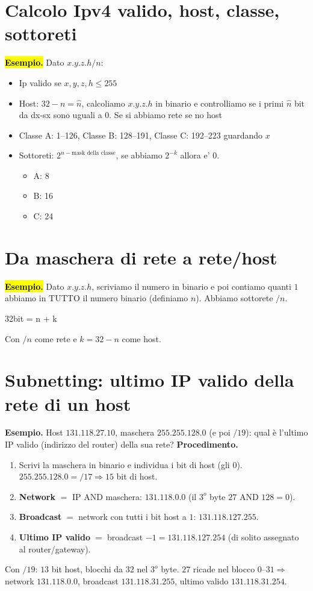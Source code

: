\documentclass[11pt,a4paper]{report}
\begin{document}
\section{Calcolo Ipv4 valido, host, classe, sottoreti}
\label{teoria:ipv4calc}
\hl{\textbf{Esempio.}} Dato $x.y.z.h/n$:
\begin{itemize}
  \item Ip valido se $x,y,z,h \leq 255$
  \item Host: $32-n=\hat{n}$, calcoliamo $x.y.z.h$ in binario e controlliamo se i primi $\hat{n}$ bit da dx-sx sono uguali a 0. Se si abbiamo rete se no host
  \item Classe A: 1–126, Classe B: 128–191, Classe C: 192–223 guardando $x$
  \item Sottoreti: $2^{n - \text{mask della classe}}$, se abbiamo $2^{-k}$ allora e' 0.
  \begin{itemize}
    \item A: 8
    \item B: 16
    \item C: 24
  \end{itemize}
\end{itemize}

\section{Da maschera di rete a rete/host}
\label{teoria:maskto}
\hl{\textbf{Esempio.}} Dato $x.y.z.h$, scriviamo il numero in binario e poi contiamo quanti $1$ abbiamo in TUTTO il numero binario (definiamo $n$). Abbiamo sottorete $/n$.
\begin{center}
  32bit = n + k
\end{center}
Con $/n$ come rete e $k=32-n$ come host.

\section{Subnetting: ultimo IP valido della rete di un host}
\label{teoria:subnetlast}
\textbf{Esempio.} Host $131.118.27.10$, maschera $255.255.128.0$ (e poi $/19$): qual è l'ultimo IP valido (indirizzo del router) della sua rete?
\textbf{Procedimento.}
\begin{enumerate}[noitemsep]
\item Scrivi la maschera in binario e individua i bit di host (gli $0$). $255.255.128.0=/17 \Rightarrow 15$ bit di host.
\item \textbf{Network} $=$ IP AND maschera: $131.118.0.0$ (il $3^o$ byte $27$ AND $128 = 0$).
\item \textbf{Broadcast} $=$ network con tutti i bit host a $1$: $131.118.127.255$.
\item \textbf{Ultimo IP valido} $=$ broadcast $-1 = 131.118.127.254$ (di solito assegnato al router/gateway).
\end{enumerate}
Con $/19$: $13$ bit host, blocchi da $32$ nel $3^o$ byte. $27$ ricade nel blocco $0$--$31 \Rightarrow$ network $131.118.0.0$, broadcast $131.118.31.255$, ultimo valido $131.118.31.254$.
\end{document}
